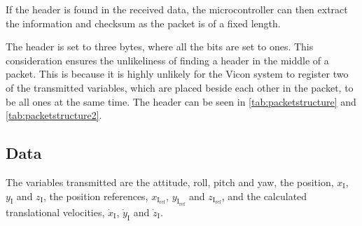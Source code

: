 If the header is found in the received data, the microcontroller can then extract the information and checksum as the packet is of a fixed length. 

The header is set to three bytes, where all the bits are set to ones. This consideration ensures the unlikeliness of finding a header in the middle of a packet. This is because it is highly unlikely for the Vicon system to register two of the transmitted variables, which are placed beside each other in the packet, to be all ones at the same time. The header can be seen in \autoref{tab:packetstructure} and \autoref{tab:packetstructure2}.

\subsection{Data}
The variables transmitted are the attitude, roll, pitch and yaw, the position, $x_{\mathrm{I}}$, $y_{\mathrm{I}}$ and $z_{\mathrm{I}}$, the position references, $x_{\mathrm{I_{ref}}}$, $y_{\mathrm{I_{ref}}}$ and $z_{\mathrm{I_{ref}}}$, and the calculated translational velocities, $\dot{x}_{\mathrm{I}}$, $\dot{y}_{\mathrm{I}}$ and $\dot{z}_{\mathrm{I}}$. 

